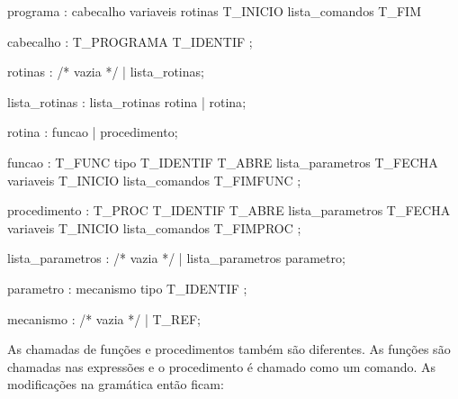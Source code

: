 \documentclass[
  brazilian,
  letterpaper,
]{book}
\newenvironment{Shaded}{\begin{snugshade}}{\end{snugshade}}
\newcommand{\CommentTok}[1]{\textcolor[rgb]{0.37,0.37,0.37}{#1}}
\newcommand{\NormalTok}[1]{\textcolor[rgb]{0.00,0.23,0.31}{#1}}
\newcommand{\OperatorTok}[1]{\textcolor[rgb]{0.37,0.37,0.37}{#1}}
\theoremstyle{plain}
\theoremstyle{definition}
\theoremstyle{remark}
\begin{document}
\begin{Shaded}
\begin{Highlighting}[]
\NormalTok{programa }
  \OperatorTok{:}\NormalTok{ cabecalho }
\NormalTok{    variaveis }
\NormalTok{    rotinas}
\NormalTok{    T\_INICIO lista\_comandos T\_FIM }

\NormalTok{cabecalho }
  \OperatorTok{:}\NormalTok{ T\_PROGRAMA T\_IDENTIF }\OperatorTok{;}

\NormalTok{rotinas }
  \OperatorTok{:} \CommentTok{/* vazia */}
  \OperatorTok{|}\NormalTok{ lista\_rotinas}\OperatorTok{;}

\NormalTok{lista\_rotinas}
  \OperatorTok{:}\NormalTok{ lista\_rotinas rotina}
  \OperatorTok{|}\NormalTok{ rotina}\OperatorTok{;}

\NormalTok{rotina }
  \OperatorTok{:}\NormalTok{ funcao }
  \OperatorTok{|}\NormalTok{ procedimento}\OperatorTok{;}

\NormalTok{funcao }
  \OperatorTok{:}\NormalTok{ T\_FUNC tipo T\_IDENTIF}
\NormalTok{    T\_ABRE lista\_parametros T\_FECHA}
\NormalTok{    variaveis}
\NormalTok{    T\_INICIO lista\_comandos T\_FIMFUNC }
    \OperatorTok{;}

\NormalTok{procedimento }
  \OperatorTok{:}\NormalTok{ T\_PROC T\_IDENTIF}
\NormalTok{    T\_ABRE lista\_parametros T\_FECHA}
\NormalTok{    variaveis}
\NormalTok{    T\_INICIO lista\_comandos T\_FIMPROC }
    \OperatorTok{;}

\NormalTok{lista\_parametros }
  \OperatorTok{:} \CommentTok{/* vazia */}
  \OperatorTok{|}\NormalTok{ lista\_parametros parametro}\OperatorTok{;}

\NormalTok{parametro }
  \OperatorTok{:}\NormalTok{ mecanismo tipo T\_IDENTIF }
    \OperatorTok{;}

\NormalTok{mecanismo }
  \OperatorTok{:} \CommentTok{/* vazia */} 
  \OperatorTok{|}\NormalTok{ T\_REF}\OperatorTok{;} 
\end{Highlighting}
\end{Shaded}

As chamadas de funções e procedimentos também são diferentes. As funções
são chamadas nas expressões e o procedimento é chamado como um comando.
As modificações na gramática então ficam:
\end{document}

